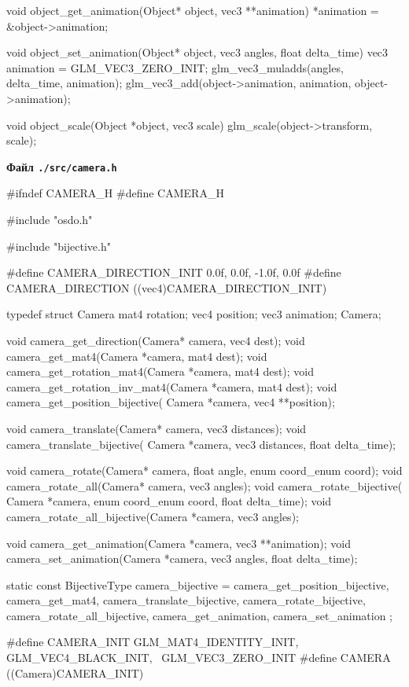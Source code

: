 \documentclass[14pt,a4paper]{extarticle}
\theoremstyle{definition}
\renewcommand{\[}{\begin{singlespace}\begin{equation*}}
\renewcommand{\]}{\end{equation*}\end{singlespace}}
\begin{document}
\begin{multicols}{2}
\begin{ccode}
void object_get_animation(Object* object, vec3 **animation) {
    *animation = &object->animation;
}

void object_set_animation(Object* object, vec3 angles, float delta_time) {
    vec3 animation = GLM_VEC3_ZERO_INIT;
    glm_vec3_muladds(angles, delta_time, animation);
    glm_vec3_add(object->animation, animation,
                 object->animation);
}

void object_scale(Object *object, vec3 scale) {
    glm_scale(object->transform, scale);
}
\end{ccode}
\noindent\cprotect\textbf{Файл \verb+./src/camera.h+}
\begin{ccode}
#ifndef CAMERA_H
#define CAMERA_H

#include "osdo.h"

#include "bijective.h"

#define CAMERA_DIRECTION_INIT {0.0f, 0.0f, -1.0f, 0.0f}
#define CAMERA_DIRECTION ((vec4)CAMERA_DIRECTION_INIT)

typedef struct Camera {
    mat4 rotation;
    vec4 position;
    vec3 animation;
} Camera;

void camera_get_direction(Camera* camera, vec4 dest);
void camera_get_mat4(Camera *camera, mat4 dest);
void camera_get_rotation_mat4(Camera *camera, mat4 dest);
void camera_get_rotation_inv_mat4(Camera *camera, mat4 dest);
void camera_get_position_bijective(
        Camera *camera, vec4 **position);

void camera_translate(Camera* camera, vec3 distances);
void camera_translate_bijective(
        Camera *camera, vec3 distances, float delta_time);

void camera_rotate(Camera* camera, float angle, enum coord_enum coord);
void camera_rotate_all(Camera* camera, vec3 angles);
void camera_rotate_bijective(
        Camera *camera, enum coord_enum coord, float delta_time);
void camera_rotate_all_bijective(Camera *camera, vec3 angles);

void camera_get_animation(Camera *camera, vec3 **animation);
void camera_set_animation(Camera *camera, vec3 angles, float delta_time);

static const BijectiveType camera_bijective = {
    camera_get_position_bijective,
    camera_get_mat4,
    camera_translate_bijective,
    camera_rotate_bijective,
    camera_rotate_all_bijective,
    camera_get_animation,
    camera_set_animation
};

#define CAMERA_INIT {GLM_MAT4_IDENTITY_INIT, GLM_VEC4_BLACK_INIT, \
    GLM_VEC3_ZERO_INIT}
#define CAMERA ((Camera)CAMERA_INIT)


\end{ccode}
\end{multicols}
\end{document}
